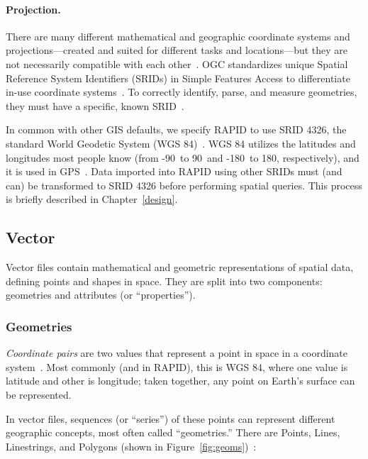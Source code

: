 \paragraph{Projection.}
There are many different mathematical and geographic coordinate systems and projections---created and suited for different tasks and locations---but they are not necessarily compatible with each other~\cite{Kottman2009}. OGC standardizes unique Spatial Reference System Identifiers (SRIDs) in Simple Features Access to differentiate in-use coordinate systems~\cite{SFA}. To correctly identify, parse, and measure geometries, they must have a specific, known SRID~\cite{Kottman2009}.
  
In common with other GIS defaults, we specify RAPID to use SRID 4326, the standard World Geodetic System (WGS 84)~\cite{Nima2000,SFA}. WGS 84 utilizes the latitudes and longitudes most people know (from -90\textdegree~to 90\textdegree~and -180\textdegree~to 180\textdegree, respectively), and it is used in GPS~\cite{Nima2000}. Data imported into RAPID using other SRIDs must (and can) be transformed to SRID 4326 before performing spatial queries. This process is briefly described in Chapter~\ref{design}.

\subsection{Vector}
\label{sec:vector}
Vector files contain mathematical and geometric representations of spatial data, defining points and shapes in space. They are split into two components: geometries and attributes (or ``properties'').

\subsubsection{Geometries}
\textit{Coordinate pairs} are two values that represent a point in space in a coordinate system~\cite{gentle_intro}. Most commonly (and in RAPID), this is WGS 84, where one value is latitude and other is longitude; taken together, any point on Earth's surface can be represented.

In vector files, sequences (or ``series'') of these points can represent different geographic concepts, most often called ``geometries.'' There are Points, Lines, Linestrings, and Polygons (shown in Figure~\ref{fig:geoms})~\cite{gentle_intro}:

